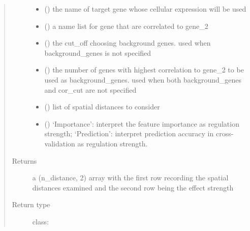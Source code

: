 \documentclass[letterpaper,10pt,english]{sphinxmanual}
\begin{document}
\begin{fulllineitems}
\begin{fulllineitems}
\begin{quote}
\begin{description}
\begin{itemize}
\item {} 
 () \textendash{} the name of target gene whose cellular expression will be used

\item {} 
 () \textendash{} a name list for gene that are correlated to gene\_2

\item {} 
 () \textendash{} the cut\_off choosing background genes. used when background\_genes is not specified

\item {} 
 () \textendash{} the number of genes with highest correlation to gene\_2 to be used as background\_genes. used when both background\_genes and cor\_cut are not specified

\item {} 
 () \textendash{} list of spatial distances to consider

\item {} 
 (\sphinxstyleliteralemphasis{, }) \textendash{} ‘Importance’: interpret the feature importance as regulation strength; ‘Prediction’: interpret prediction accuracy in cross-validation as regulation strength.

\end{itemize}

\item[{Returns}] \leavevmode
a (n\_distance, 2) array with the first row recording the spatial distances examined and the second row being the effect strength

\item[{Return type}] \leavevmode
class:

\end{description}\end{quote}

\end{fulllineitems}



\end{fulllineitems}
\end{document}

